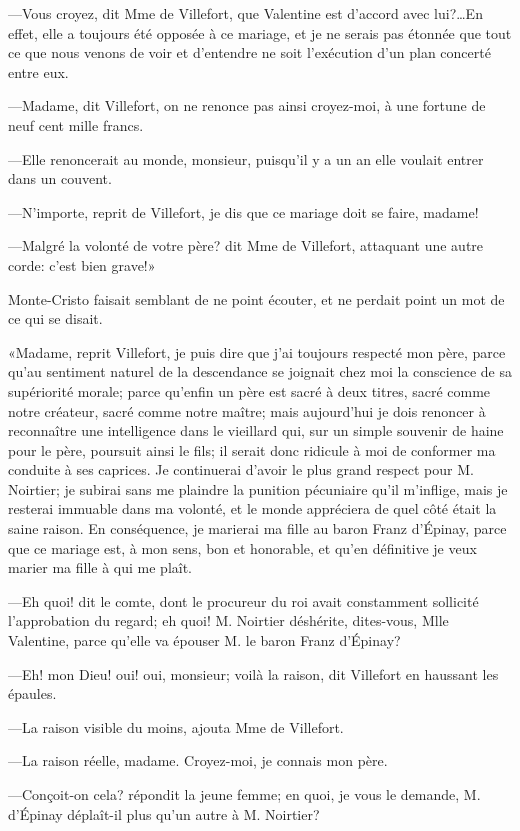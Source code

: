 —Vous croyez, dit Mme de Villefort, que Valentine est d'accord avec lui?\dots En effet, elle a toujours été opposée à ce mariage, et je ne serais pas étonnée que tout ce que nous venons de voir et d'entendre ne soit l'exécution d'un plan concerté entre eux.  

—Madame, dit Villefort, on ne renonce pas ainsi croyez-moi, à une fortune de neuf cent mille francs. 

—Elle renoncerait au monde, monsieur, puisqu'il y a un an elle voulait entrer dans un couvent. 

—N'importe, reprit de Villefort, je dis que ce mariage doit se faire, madame! 

—Malgré la volonté de votre père? dit Mme de Villefort, attaquant une autre corde: c'est bien grave!» 

Monte-Cristo faisait semblant de ne point écouter, et ne perdait point un mot de ce qui se disait. 

«Madame, reprit Villefort, je puis dire que j'ai toujours respecté mon père, parce qu'au sentiment naturel de la descendance se joignait chez moi la conscience de sa supériorité morale; parce qu'enfin un père est sacré à deux titres, sacré comme notre créateur, sacré comme notre maître; mais aujourd'hui je dois renoncer à reconnaître une intelligence dans le vieillard qui, sur un simple souvenir de haine pour le père, poursuit ainsi le fils; il serait donc ridicule à moi de conformer ma conduite à ses caprices. Je continuerai d'avoir le plus grand respect pour M. Noirtier; je subirai sans me plaindre la punition pécuniaire qu'il m'inflige, mais je resterai immuable dans ma volonté, et le monde appréciera de quel côté était la saine raison. En conséquence, je marierai ma fille au baron Franz d'Épinay, parce que ce mariage est, à mon sens, bon et honorable, et qu'en définitive je veux marier ma fille à qui me plaît. 

—Eh quoi! dit le comte, dont le procureur du roi avait constamment sollicité l'approbation du regard; eh quoi! M. Noirtier déshérite, dites-vous, Mlle Valentine, parce qu'elle va épouser M. le baron Franz d'Épinay? 

—Eh! mon Dieu! oui! oui, monsieur; voilà la raison, dit Villefort en haussant les épaules. 

—La raison visible du moins, ajouta Mme de Villefort. 

—La raison réelle, madame. Croyez-moi, je connais mon père. 

—Conçoit-on cela? répondit la jeune femme; en quoi, je vous le demande, M. d'Épinay déplaît-il plus qu'un autre à M. Noirtier? 

